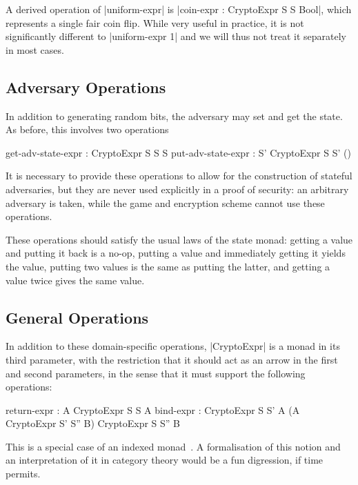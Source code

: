 A derived operation of |uniform-expr| is |coin-expr :  \to CryptoExpr S S Bool|, which represents a single
fair coin flip.  While very useful in practice, it is not significantly different to |uniform-expr 1| and we will thus
not treat it separately in most cases.

\subsection{Adversary Operations}

In addition to generating random bits, the adversary may set and get the state.  As before, this involves two operations
\begin{code}
    get-adv-state-expr :  \to CryptoExpr S S S
    put-adv-state-expr :  \to S' \to CryptoExpr S S' ()
\end{code}

It is necessary to provide these operations to allow for the construction of stateful adversaries, but they are never
used explicitly in a proof of security: an arbitrary adversary is taken, while the game and encryption scheme cannot use
these operations.

These operations should satisfy the usual laws of the state monad: getting a value and putting it back is a no-op,
putting a value and immediately getting it yields the value, putting two values is the same as putting the latter, and
getting a value twice gives the same value.

\subsection{General Operations}

In addition to these domain-specific operations, |CryptoExpr| is a monad in its third parameter, with the restriction
that it should act as an arrow in the first and second parameters, in the sense that it must support the following
operations:
\begin{code}
    return-expr :  \to A \to CryptoExpr S S A
    bind-expr :  \to CryptoExpr S S' A
              \to (A \to CryptoExpr S' S'' B)
              \to CryptoExpr S S'' B
\end{code}

This is a special case of an indexed monad~\cite{indexedmonads}.  A formalisation of this notion and an interpretation
of it in category theory would be a fun digression, if time permits.

